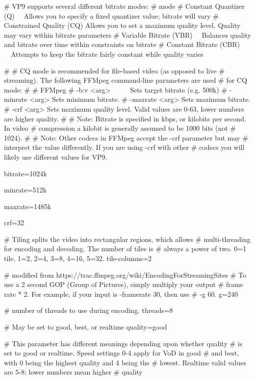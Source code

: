 \# VP9 supports several different bitrate modes:
\# mode 
\# Constant Quantizer (Q) \ \ Allows you to specify a fixed quantizer value; bitrate will vary
\# Constrained Quality (CQ) Allows you to set a maximum quality level. Quality may vary within bitrate parameters
\# Variable Bitrate (VBR) \ \ Balances quality and bitrate over time within constraints on bitrate
\# Constant Bitrate (CBR) \ \ Attempts to keep the bitrate fairly constant while quality varies

\#
\# CQ mode is recommended for file-based video (as opposed to live
\# streaming). The following FFMpeg command-line parameters are used
\# for CQ mode:
\#
\# FFMpeg 
\# -b:v {\textless}arg{\textgreater} \ \ \ \ \ Sets target bitrate (e.g. 500k)
\# -minrate {\textless}arg{\textgreater} Sets minimum bitrate.
\# -maxrate {\textless}arg{\textgreater} Sets maximum bitrate.
\# -crf {\textless}arg{\textgreater} Sets maximum quality level. Valid values are 0-63, lower numbers are higher quality.
\#
\# Note: Bitrate is specified in kbps, or kilobits per second. In video
\# compression a kilobit is generally assumed to be 1000 bits (not
\# 1024).
\#
\# Note: Other codecs in FFMpeg accept the -crf parameter but may
\# interpret the value differently. If you are using -crf with other
\# codecs you will likely use different values for VP9.

bitrate=1024k

minrate=512k

maxrate=1485k

crf=32
\medskip

\# Tiling splits the video into rectangular regions, which allows
\# multi-threading for encoding and decoding. The number of tiles is
\# always a power of two. 0=1 tile, 1=2, 2=4, 3=8, 4=16, 5=32.
tile-columns=2
\medskip

\# modified from https://trac.ffmpeg.org/wiki/EncodingForStreamingSites
\# To use a 2 second GOP (Group of Pictures), simply multiply your output
\# frame rate * 2. For example, if your input is -framerate 30, then use
\# -g 60.
g=240
\medskip

\# number of threads to use during encoding.
threads=8
\medskip

\# May be set to good, best, or realtime
quality=good
\medskip

\# This parameter has different meanings depending upon whether quality
\# is set to good or realtime. Speed settings 0-4 apply for VoD in good
\# and best, with 0 being the highest quality and 4 being the
\# lowest. Realtime valid values are 5-8; lower numbers mean higher
\# quality
\medskip

